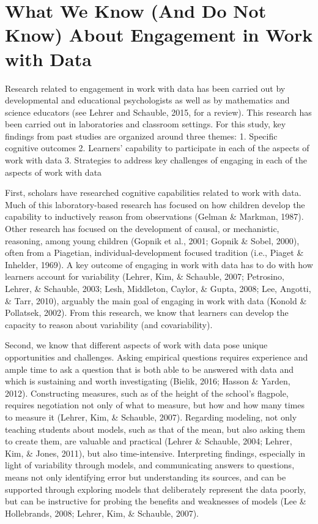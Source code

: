 \documentclass[]{msu-thesis}
\theoremstyle{definition}
\theoremstyle{definition}
\theoremstyle{definition}
\theoremstyle{remark}
\begin{document}
\section{What We Know (And Do Not Know) About Engagement in Work with
Data}\label{what-we-know-and-do-not-know-about-engagement-in-work-with-data}

Research related to engagement in work with data has been carried out by
developmental and educational psychologists as well as by mathematics
and science educators (see Lehrer and Schauble, 2015, for a review).
This research has been carried out in laboratories and classroom
settings. For this study, key findings from past studies are organized
around three themes: 1. Specific cognitive outcomes 2. Learners'
capability to participate in each of the aspects of work with data 3.
Strategies to address key challenges of engaging in each of the aspects
of work with data

First, scholars have researched cognitive capabilities related to work
with data. Much of this laboratory-based research has focused on how
children develop the capability to inductively reason from observations
(Gelman \& Markman, 1987). Other research has focused on the development
of causal, or mechanistic, reasoning, among young children (Gopnik et
al., 2001; Gopnik \& Sobel, 2000), often from a Piagetian,
individual-development focused tradition (i.e., Piaget \& Inhelder,
1969). A key outcome of engaging in work with data has to do with how
learners account for variability (Lehrer, Kim, \& Schauble, 2007;
Petrosino, Lehrer, \& Schauble, 2003; Lesh, Middleton, Caylor, \& Gupta,
2008; Lee, Angotti, \& Tarr, 2010), arguably the main goal of engaging
in work with data (Konold \& Pollatsek, 2002). From this research, we
know that learners can develop the capacity to reason about variability
(and covariability).

Second, we know that different aspects of work with data pose unique
opportunities and challenges. Asking empirical questions requires
experience and ample time to ask a question that is both able to be
answered with data and which is sustaining and worth investigating
(Bielik, 2016; Hasson \& Yarden, 2012). Constructing measures, such as
of the height of the school's flagpole, requires negotiation not only of
what to measure, but how and how many times to measure it (Lehrer, Kim,
\& Schauble, 2007). Regarding modeling, not only teaching students about
models, such as that of the mean, but also asking them to create them,
are valuable and practical (Lehrer \& Schauble, 2004; Lehrer, Kim, \&
Jones, 2011), but also time-intensive. Interpreting findings, especially
in light of variability through models, and communicating answers to
questions, means not only identifying error but understanding its
sources, and can be supported through exploring models that deliberately
represent the data poorly, but can be instructive for probing the
benefits and weaknesses of models (Lee \& Hollebrands, 2008; Lehrer,
Kim, \& Schauble, 2007).
\end{document}
